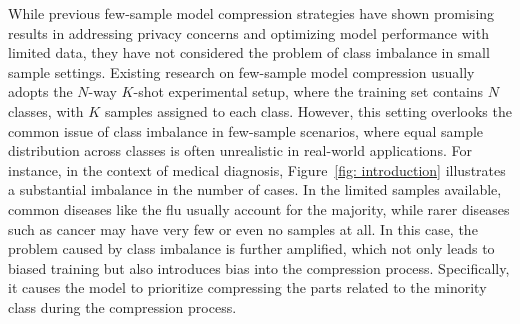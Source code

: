 \documentclass[twoside,11pt]{article}
\begin{document}
While previous few-sample model compression strategies have shown promising results in addressing privacy concerns and optimizing model performance with limited data, they have not considered the problem of class imbalance in small sample settings. Existing research on few-sample model compression usually adopts the $N$-way $K$-shot experimental setup, where the training set contains $N$ classes, with $K$ samples assigned to each class. However, this setting overlooks the common issue of class imbalance in few-sample scenarios, where equal sample distribution across classes is often unrealistic in real-world applications. For instance, in the context of medical diagnosis, Figure~\ref{fig: introduction} illustrates a substantial imbalance in the number of cases. In the limited samples available, common diseases like the flu usually account for the majority, while rarer diseases such as cancer may have very few or even no samples at all. In this case, the problem caused by class imbalance is further amplified, which not only leads to biased training but also introduces bias into the compression process. Specifically, it causes the model to prioritize compressing the parts related to the minority class during the compression process.
\end{document}
